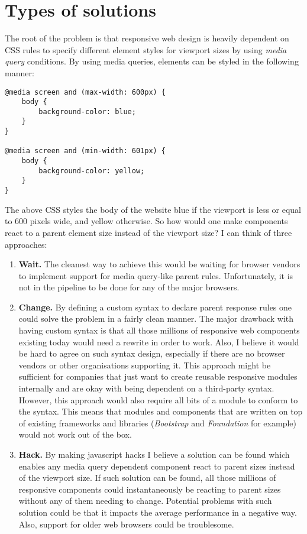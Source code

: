 \documentclass[oneside,a4paper,11pt]{kth-mag}
\begin{document}
\section*{Types of solutions}
The root of the problem is that responsive web design is heavily dependent on CSS rules to specify different element styles for viewport sizes by using \emph{media query} conditions. By using media queries, elements can be styled in the following manner:
\begin{lstlisting}[frame=single]
@media screen and (max-width: 600px) {
    body {
        background-color: blue;
    }
}

@media screen and (min-width: 601px) {
    body {
        background-color: yellow;
    }
}
\end{lstlisting}
The above CSS styles the body of the website blue if the viewport is less or equal to 600 pixels wide, and yellow otherwise. So how would one make components react to a parent element size instead of the viewport size? I can think of three approaches:
\begin{enumerate}
	\item \textbf{Wait.} The cleanest way to achieve this would be waiting for browser vendors to implement support for media query-like parent rules. Unfortunately, it is not in the pipeline to be done for any of the major browsers.
	\item \textbf{Change.} By defining a custom syntax to declare parent response rules one could solve the problem in a fairly clean manner. The major drawback with having custom syntax is that all those millions of responsive web components existing today would need a rewrite in order to work. Also, I believe it would be hard to agree on such syntax design, especially if there are no browser vendors or other organisations supporting it. This approach might be sufficient for companies that just want to create reusable responsive modules internally and are okay with being dependent on a third-party syntax. However, this approach would also require all bits of a module to conform to the syntax. This means that modules and components that are written on top of existing frameworks and libraries (\emph{Bootstrap} and \emph{Foundation} for example) would not work out of the box. \item \textbf{Hack.} By making javascript hacks I believe a solution can be found which enables any media query dependent component react to parent sizes instead of the viewport size. If such solution can be found, all those millions of responsive components could instantaneously be reacting to parent sizes without any of them needing to change. Potential problems with such solution could be that it impacts the average performance in a negative way. Also, support for older web browsers could be troublesome. \end{enumerate}
\end{document}
